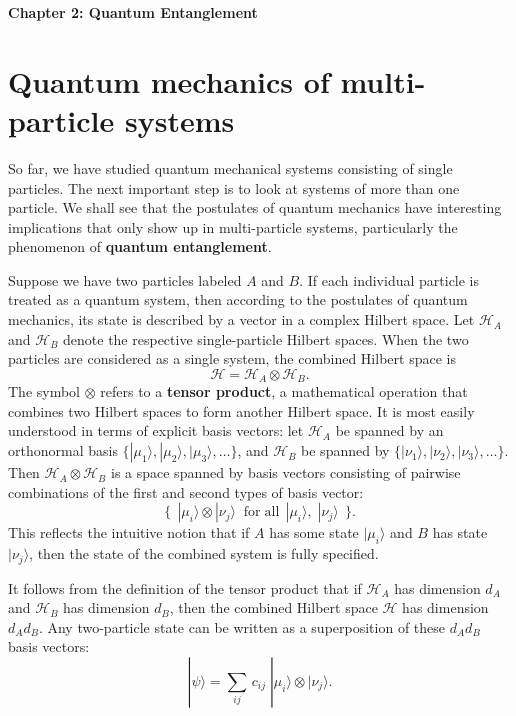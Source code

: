 \documentclass[pra,12pt]{revtex4}
\begin{document}
\begin{center}
{\Large \textbf{Chapter 2: Quantum Entanglement}}
\end{center}

\section{Quantum mechanics of multi-particle systems}
\label{sec:tensorprod}

So far, we have studied quantum mechanical systems consisting of
single particles.  The next important step is to look at systems of
more than one particle.  We shall see that the postulates of quantum
mechanics have interesting implications that only show up in
multi-particle systems, particularly the phenomenon of \textbf{quantum
  entanglement}.

Suppose we have two particles labeled $A$ and $B$.  If each individual
particle is treated as a quantum system, then according to the
postulates of quantum mechanics, its state is described by a vector in
a complex Hilbert space.  Let $\mathscr{H}_A$ and $\mathscr{H}_B$
denote the respective single-particle Hilbert spaces.  When the two
particles are considered as a single system, the combined Hilbert
space is
\begin{equation}
  \mathscr{H} = \mathscr{H}_A\otimes \mathscr{H}_B.
\end{equation}
The symbol $\otimes$ refers to a \textbf{tensor product}, a
mathematical operation that combines two Hilbert spaces to form
another Hilbert space.  It is most easily understood in terms of
explicit basis vectors: let $\mathscr{H}_A$ be spanned by an
orthonormal basis $\{|\mu_1\rangle, |\mu_2\rangle, |\mu_3\rangle,
\dots\}$, and $\mathscr{H}_B$ be spanned by $\{|\nu_1\rangle,
|\nu_2\rangle, |\nu_3\rangle, \dots\}$.  Then $\mathscr{H}_A \otimes
\mathscr{H}_B$ is a space spanned by basis vectors consisting of
pairwise combinations of the first and second types of basis vector:
\begin{equation}
  \Big\{\;\,|\mu_i\rangle\otimes|\nu_j\rangle \;\;  \textrm{for} \; \textrm{all}\;\,|\mu_i\rangle,\; |\nu_j\rangle \;\,\Big\}.
\end{equation}
This reflects the intuitive notion that if $A$ has some state
$|\mu_i\rangle$ and $B$ has state $|\nu_j\rangle$, then the state of
the combined system is fully specified.

It follows from the definition of the tensor product that if
$\mathscr{H}_A$ has dimension $d_A$ and $\mathscr{H}_B$ has dimension
$d_B$, then the combined Hilbert space $\mathscr{H}$ has dimension
$d_A d_B$.  Any two-particle state can be written as a superposition
of these $d_A d_B$ basis vectors:
\begin{equation}
  |\psi\rangle = \sum_{ij} \, c_{ij}\; |\mu_i\rangle \otimes |\nu_j\rangle.
\end{equation}
\end{document}
